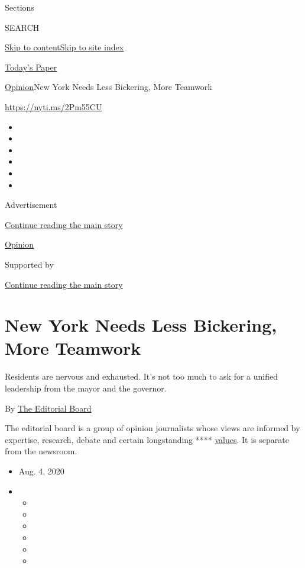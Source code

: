 Sections

SEARCH

\protect\hyperlink{site-content}{Skip to
content}\protect\hyperlink{site-index}{Skip to site index}

\href{https://myaccount.nytimes3xbfgragh.onion/auth/login?response_type=cookie\&client_id=vi}{}

\href{https://www.nytimes3xbfgragh.onion/section/todayspaper}{Today's
Paper}

\href{/section/opinion}{Opinion}\textbar{}New York Needs Less Bickering,
More Teamwork

\url{https://nyti.ms/2Pm55CU}

\begin{itemize}
\item
\item
\item
\item
\item
\item
\end{itemize}

Advertisement

\protect\hyperlink{after-top}{Continue reading the main story}

\href{/section/opinion}{Opinion}

Supported by

\protect\hyperlink{after-sponsor}{Continue reading the main story}

\hypertarget{new-york-needs-less-bickering-more-teamwork}{%
\section{New York Needs Less Bickering, More
Teamwork}\label{new-york-needs-less-bickering-more-teamwork}}

Residents are nervous and exhausted. It's not too much to ask for a
unified leadership from the mayor and the governor.

By
\href{https://www.nytimes3xbfgragh.onion/interactive/opinion/editorialboard.html}{The
Editorial Board}

The editorial board is a group of opinion journalists whose views are
informed by expertise, research, debate and certain longstanding ****
\href{https://www.nytimes3xbfgragh.onion/interactive/2018/opinion/editorialboard.html}{values}.
It is separate from the newsroom.

\begin{itemize}
\item
  Aug. 4, 2020
\item
  \begin{itemize}
  \item
  \item
  \item
  \item
  \item
  \item
  \end{itemize}
\end{itemize}

